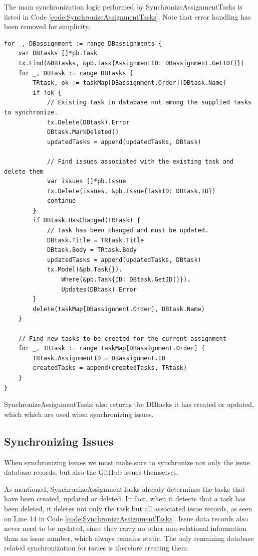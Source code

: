 The main synchronization logic performed by SynchronizeAssignmentTasks is listed in Code \ref{code:SynchronizeAssignmentTasks}.
Note that error handling has been removed for simplicity.

\begin{lstlisting}[caption={Task synchronization performed by SynchronizeAssignmentTasks}, 
                            language=Golang, label={code:SynchronizeAssignmentTasks}]
for _, DBassignment := range DBassignments {
	var DBtasks []*pb.Task
	tx.Find(&DBtasks, &pb.Task{AssignmentID: DBassignment.GetID()})
	for _, DBtask := range DBtasks {
		TRtask, ok := taskMap[DBassignment.Order][DBtask.Name]
		if !ok {
			// Existing task in database not among the supplied tasks to synchronize.
			tx.Delete(DBtask).Error
			DBtask.MarkDeleted()
			updatedTasks = append(updatedTasks, DBtask)
			
			// Find issues associated with the existing task and delete them
			var issues []*pb.Issue
			tx.Delete(issues, &pb.Issue{TaskID: DBtask.ID})
			continue
		}
		if DBtask.HasChanged(TRtask) {
			// Task has been changed and must be updated.
			DBtask.Title = TRtask.Title
			DBtask.Body = TRtask.Body
			updatedTasks = append(updatedTasks, DBtask)
			tx.Model(&pb.Task{}).
				Where(&pb.Task{ID: DBtask.GetID()}).
				Updates(DBtask).Error
		}
		delete(taskMap[DBassignment.Order], DBtask.Name)
	}

	// Find new tasks to be created for the current assignment
	for _, TRtask := range taskMap[DBassignment.Order] {
		TRtask.AssignmentID = DBassignment.ID
		createdTasks = append(createdTasks, TRtask)
	}
}
\end{lstlisting}

SynchronizeAssignmentTasks also returns the DBtasks it has created or updated, which which are used when synchronizing issues.

\subsection{Synchronizing Issues}

When synchronizing issues we must make sure to synchronize not only the issue database records, but also the GitHub issues themselves.

As mentioned, SynchronizeAssignmentTasks already determines the tasks that have been created, updated or deleted.
In fact, when it detects that a task has been deleted, it deletes not only the task but all associated issue records, as seen on Line 14 in Code \ref{code:SynchronizeAssignmentTasks}.
Issue data records also never need to be updated, since they carry no other non-relational information than an issue number, which always remains static.
The only remaining database related synchronization for issues is therefore creating them.

